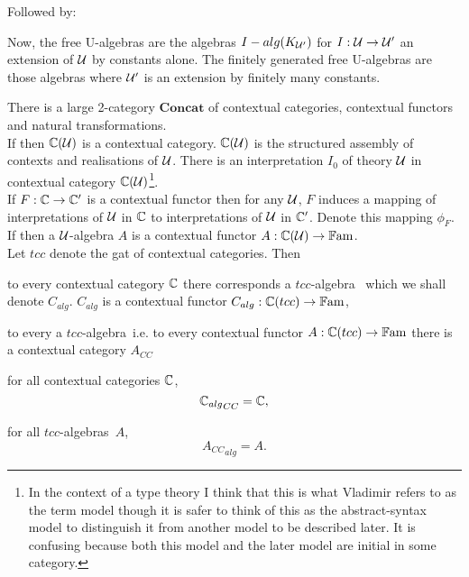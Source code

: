 \documentclass[10pt,a4paper]{article}
\theoremstyle{remark}
\newcommand{\catofccs}{\mathbf{Concat}}
\newcommand{\alg}[1]{{#1}_{alg}}
\newcommand{\cc}[1]{{#1}_{CC}}
\newcommand{\tccalgebra}{$tcc$-algebra\ }
\newcommand{\tccalgebras}{$tcc$-algebras\ }
\begin{document}
Followed by:
\begin{tightquote}
Now, the free U-algebras are the algebras $I-alg(\KUp)$ for $I: \gat[U] \morph \gat[U']$ an extension of $\gat[U]$ by constants alone. The finitely generated free U-algebras are those algebras where $\gat[U']$ is an extension by finitely many constants. \\
\end{tightquote}

\note There is a large 2-category $\catofccs$ of contextual categories, contextual functors and natural transformations. \\

\note
If \isagat[U] then $\CofU$ is a contextual category. 
$\CofU$ is the structured assembly of contexts and realisations of $\gat[U]$.
There is an interpretation $I_0$ of theory $\gat[U]$ in contextual category
$\CofU$\footnote{
In the context of a type theory I think that this is what Vladimir refers to as the term model though it is safer to think of this as the abstract-syntax model to distinguish it from another model to be described later. It is confusing because both this model and the later model are initial in some category.}.\\

\note If $F : \ccat[C] \morph \ccat[C']$ is a contextual functor then for any $\gat[U]$, 
$F$ induces a mapping of interpretations of $\gat[U]$ in $\ccat[C]$ to interpretations of $\gat[U]$ in $\ccat[C']$. Denote this mapping $\phi_F$. \\

\note
If \isagat[U] then a $\gat[U]$-algebra $A$ is a contextual functor $A: \CofU \morph \Fam$. \\

\note 
Let $tcc$ denote the gat of contextual categories. Then
\begin{point}
to every contextual category $\ccat[C]$ there corresponds a \tccalgebra 
which we shall denote $\alg{C}$.  $\alg{C}$ is a contextual functor $\alg{C} :\ccat[C](tcc) \morph \Fam$,
\end{point}
\begin{point}
to every a \tccalgebra i.e. to every contextual functor $A :\ccat[C](tcc) \morph \Fam$ there is a contextual category $\cc{A}$
\end{point}
\begin{point}
for all contextual categories $\ccat[C]$,
\begin{equation}
\cc{\alg{\ccat[C]}}= \ccat[C],
\end{equation}
\end{point}
\begin{point}
for all \tccalgebras $A$,
\begin{equation}
\alg{\cc{A}} = A.
\end{equation}
\end{point}
\end{document}
